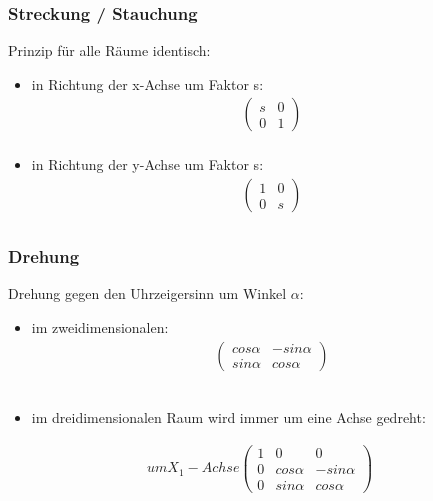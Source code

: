 \begin{frame}
	\frametitle{Streckung / Stauchung}
	Prinzip für alle Räume identisch:
	\begin{itemize}
		\item in Richtung der x-Achse um Faktor s: \begin{gather*} \begin{pmatrix}
			s & 0 \\
			0 & 1
			\end{pmatrix} \\ \end{gather*}
		\item in Richtung der y-Achse um Faktor s: \begin{gather*} \begin{pmatrix}
			1 & 0 \\
			0 & s
		\end{pmatrix} \\ \end{gather*}
	\end{itemize}
\end{frame}

\begin{frame}
	\frametitle{Drehung}
	Drehung gegen den Uhrzeigersinn um Winkel $\alpha$:
	\begin{itemize}
		\item im zweidimensionalen: \begin{gather*} \begin{pmatrix}
			cos{\alpha} & -sin{\alpha} \\
			sin{\alpha} & cos{\alpha}
			\end{pmatrix} \end{gather*} \\
		\item im dreidimensionalen Raum wird immer um eine Achse gedreht:
	\end{itemize}
		\begin{gather*} um X_{1}-Achse \begin{pmatrix}
			1 & 0 & 0 \\
			0 & cos{\alpha} & -sin{\alpha} \\
			0 & sin{\alpha} & cos{\alpha}
		\end{pmatrix} \end{gather*} \\
	
\end{frame}

